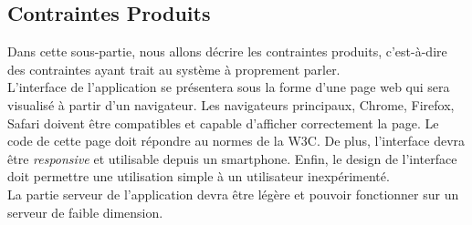 \subsection{Contraintes Produits}
Dans cette sous-partie, nous allons décrire les contraintes produits, c'est-à-dire des contraintes ayant trait au système à proprement parler.\\

L'interface de l'application se présentera sous la forme d'une page web qui sera visualisé à partir d'un navigateur. Les navigateurs principaux, Chrome, Firefox, Safari doivent être compatibles et capable d'afficher correctement la page. Le code de cette page doit répondre au normes de la W3C. De plus, l'interface devra être \emph{responsive} et utilisable depuis un smartphone. Enfin, le design de l'interface doit permettre une utilisation simple à un utilisateur inexpérimenté.\\

La partie serveur de l'application devra être légère et pouvoir fonctionner sur un serveur de faible dimension.\\
